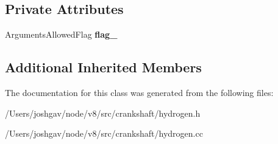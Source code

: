 \subsection*{Private Attributes}
\begin{DoxyCompactItemize}
\item 
Arguments\+Allowed\+Flag {\bfseries flag\+\_\+}\hypertarget{classv8_1_1internal_1_1_value_context_a9f580ae84a7c3d75f003a862d57df7f7}{}\label{classv8_1_1internal_1_1_value_context_a9f580ae84a7c3d75f003a862d57df7f7}

\end{DoxyCompactItemize}
\subsection*{Additional Inherited Members}


The documentation for this class was generated from the following files\+:\begin{DoxyCompactItemize}
\item 
/\+Users/joshgav/node/v8/src/crankshaft/hydrogen.\+h\item 
/\+Users/joshgav/node/v8/src/crankshaft/hydrogen.\+cc\end{DoxyCompactItemize}
